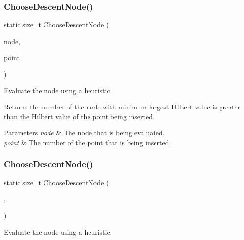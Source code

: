\subsubsection{Choose\+Descent\+Node()\hspace{0.1cm}{\footnotesize\ttfamily [1/2]}}
{\footnotesize\ttfamily static size\+\_\+t Choose\+Descent\+Node (\begin{DoxyParamCaption}\item[{Tree\+Type $\ast$}]{node,  }\item[{const size\+\_\+t}]{point }\end{DoxyParamCaption})\hspace{0.3cm}{\ttfamily [static]}}



Evaluate the node using a heuristic. 

Returns the number of the node with minimum largest Hilbert value is greater than the Hilbert value of the point being inserted.


\begin{DoxyParams}{Parameters}
{\em node} & The node that is being evaluated. \\
\hline
{\em point} & The number of the point that is being inserted. \\
\hline
\end{DoxyParams}
\mbox{\label{classmlpack_1_1tree_1_1RPlusTreeDescentHeuristic_a0250506915faf564dc80076833202b8b}} 
\subsubsection{Choose\+Descent\+Node()\hspace{0.1cm}{\footnotesize\ttfamily [2/2]}}
{\footnotesize\ttfamily static size\+\_\+t Choose\+Descent\+Node (\begin{DoxyParamCaption}\item[{const Tree\+Type $\ast$}]{,  }\item[{const Tree\+Type $\ast$}]{ }\end{DoxyParamCaption})\hspace{0.3cm}{\ttfamily [static]}}



Evaluate the node using a heuristic. 

